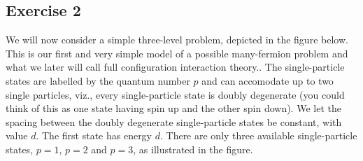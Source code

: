 \documentclass[prc]{revtex4}
\begin{document}
\subsection*{Exercise 2}
We will now consider a simple three-level problem, depicted in the figure below. This is our first and very simple model of a possible many-fermion problem and what we later will call full configuration interaction theory..
The single-particle states are labelled by the quantum number $p$ and can accomodate up to two single particles, 
viz., every single-particle state 
is doubly degenerate (you could think of this as one state having spin up and the other spin down). 
We let the spacing between the doubly degenerate single-particle states be constant, with value $d$.  The first state
has energy $d$. There are only three available single-particle states, $p=1$, $p=2$ and $p=3$, as illustrated
in the figure. 
\end{document}
